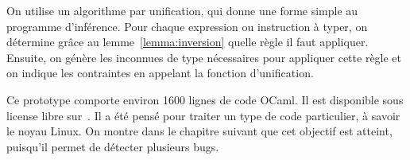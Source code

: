 On utilise un algorithme par unification, qui donne une forme simple au
programme d'inférence. Pour chaque expression ou instruction à typer, on
détermine grâce au lemme~\ref{lemma:inversion} quelle règle il faut appliquer.
Ensuite, on génère les inconnues de type nécessaires pour appliquer cette règle
et on indique les contraintes en appelant la fonction d'unification.

Ce prototype comporte environ 1600 lignes de code OCaml. Il est disponible sous
license libre sur~. Il a été pensé pour traiter un type de code
particulier, à savoir le noyau Linux. On montre dans le chapitre suivant que cet
objectif est atteint, puisqu'il permet de détecter plusieurs bugs.

